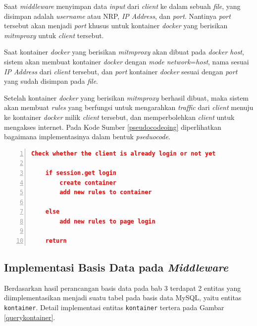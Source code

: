 Saat \textit{middleware} menyimpan data \textit{input} dari \textit{client} ke dalam sebuah \textit{file}, yang disimpan adalah \textit{username} atau NRP, \textit{IP Address}, dan \textit{port}. Nantinya \textit{port} tersebut akan menjadi \textit{port} khusus untuk kontainer \textit{docker} yang berisikan \textit{mitmproxy} untuk \textit{client} tersebut.

Saat kontainer \textit{docker} yang berisikan \textit{mitmproxy} akan dibuat pada \textit{docker host}, sistem akan membuat kontainer \textit{docker} dengan \textit{mode network}=\textit{host}, nama sesuai \textit{IP Address} dari \textit{client} tersebut, dan \textit{port} kontainer \textit{docker} sesuai dengan \textit{port} yang sudah disimpan pada \textit{file}.

Setelah kontainer \textit{docker} yang berisikan \textit{mitmproxy} berhasil dibuat, maka sistem akan membuat \textit{rules} yang berfungsi untuk mengarahkan \textit{traffic} dari \textit{client} menuju ke kontainer \textit{docker} milik \textit{client} tersebut, dan memperbolehkan \textit{client} untuk mengakses internet. Pada Kode Sumber \ref{pseudocodeoing} diperlihatkan bagaimana implementasinya dalam bentuk \textit{pseduocode}.

\begin{minipage}{\linewidth}  
	\begin{lstlisting}[numbers=left, frame=single,tabsize=2,breaklines,caption={Pseudocode Web Service},label=pseudocodeoing,language=json]
	Check whether the client is already login or not yet
	
	if session.get login
		create container
		add new rules to container
	
	else
		add new rules to page login
	
	return  	
	\end{lstlisting}
\end{minipage}

\subsection{Implementasi Basis Data pada \textit{Middleware}}
Berdasarkan hasil perancangan basis data pada bab 3 terdapat 2 entitas yang diimplementasikan menjadi suatu tabel pada basis data MySQL, yaitu entitas \texttt{kontainer}. Detail implementasi entitas \texttt{kontainer} tertera pada Gambar \ref{querykontainer}.


